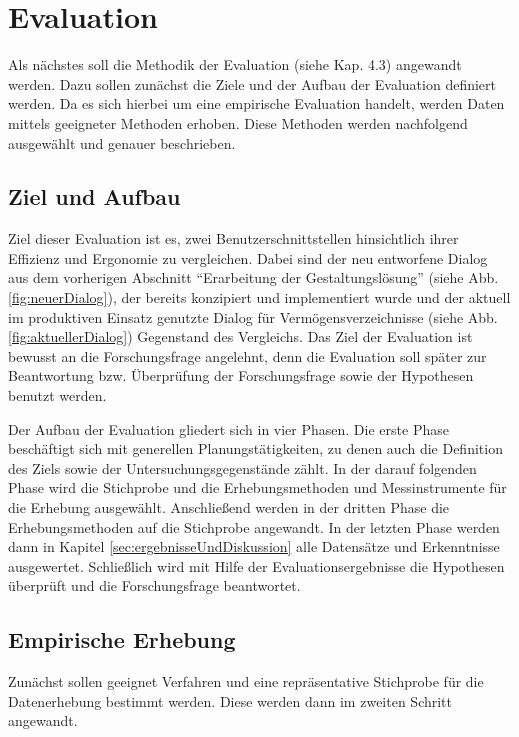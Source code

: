 \section{Evaluation}
Als nächstes soll die Methodik der Evaluation (siehe Kap. 4.3) angewandt werden. Dazu sollen zunächst die Ziele und der Aufbau der Evaluation definiert werden. Da es sich hierbei um eine empirische Evaluation handelt, werden Daten mittels geeigneter Methoden erhoben. Diese Methoden werden nachfolgend ausgewählt und genauer beschrieben.


\subsection{Ziel und Aufbau}
Ziel dieser Evaluation ist es, zwei Benutzerschnittstellen hinsichtlich ihrer Effizienz und Ergonomie zu vergleichen. Dabei sind der neu entworfene Dialog aus dem vorherigen Abschnitt \enquote{Erarbeitung der Gestaltungslösung} (siehe Abb. \ref{fig:neuerDialog}), der bereits konzipiert und implementiert wurde und der aktuell im produktiven Einsatz genutzte Dialog für Vermögensverzeichnisse (siehe Abb. \ref{fig:aktuellerDialog}) Gegenstand des Vergleichs. Das Ziel der Evaluation ist bewusst an die Forschungsfrage angelehnt, denn die Evaluation soll später zur Beantwortung bzw. Überprüfung der Forschungsfrage sowie der Hypothesen benutzt werden.

Der Aufbau der Evaluation gliedert sich in vier Phasen. Die erste Phase beschäftigt sich mit generellen Planungstätigkeiten, zu denen auch die Definition des Ziels sowie der Untersuchungsgegenstände zählt. In der darauf folgenden Phase wird die Stichprobe und die Erhebungsmethoden und Messinstrumente für die Erhebung ausgewählt. Anschließend werden in der dritten Phase die Erhebungsmethoden auf die Stichprobe angewandt. In der letzten Phase werden dann in Kapitel \ref{sec:ergebnisseUndDiskussion} alle Datensätze und Erkenntnisse ausgewertet. Schließlich wird mit Hilfe der Evaluationsergebnisse die Hypothesen überprüft und die Forschungsfrage beantwortet.


\subsection{Empirische Erhebung}
\label{sec:empirischeErhebung}
Zunächst sollen geeignet Verfahren und eine repräsentative Stichprobe für die Datenerhebung bestimmt werden. Diese werden dann im zweiten Schritt angewandt.

